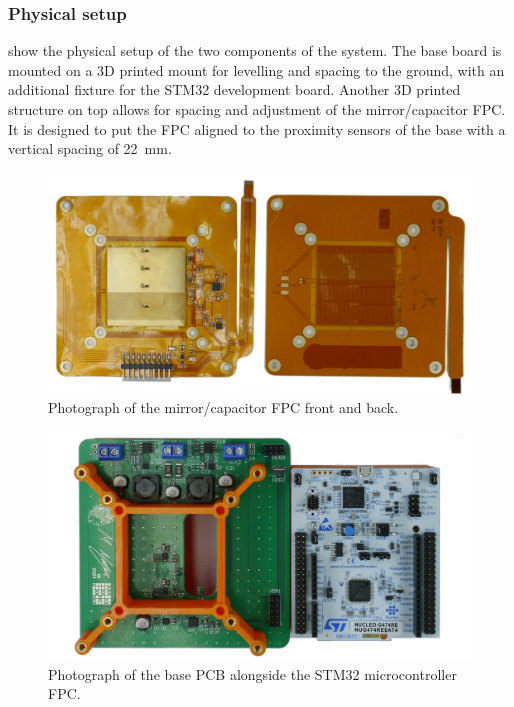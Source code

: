 \subsubsection{Physical setup}
 show the physical setup of the two components of the system. The base board is mounted on a 3D printed mount for levelling and spacing to the ground, with an additional fixture for the STM32 development board.
Another 3D printed structure on top allows for spacing and adjustment of the mirror/capacitor \gls{FPC}. It is designed to put the \gls{FPC} aligned to the proximity sensors of the base with a vertical spacing of \qty{22}{mm}.


\begin{figure}[hb!]
    \centering
    \includegraphics[width=0.9\linewidth]{images/sensor_flex1.jpg}
    \caption{Photograph of the mirror/capacitor \gls{FPC} front and back.}
    \label{i:sensor_flex}
\end{figure}

\begin{figure}[ht!]
    \centering
    \includegraphics[width=0.9\linewidth]{images/sensor_rigid1.jpg}
    \caption{Photograph of the base \gls{PCB} alongside the STM32 microcontroller \gls{FPC}.}
    \label{i:sensor_rigid}
\end{figure}

